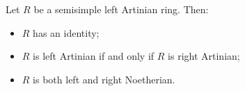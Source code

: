 Let $R$ be a semisimple left Artinian ring. Then:
\begin{itemize}
\item[(i)] $R$ has an identity;
\item[(ii)] $R$ is left Artinian if and only if $R$ is right Artinian;
\item[(iii)] $R$ is both left and right Noetherian.
\end{itemize}
